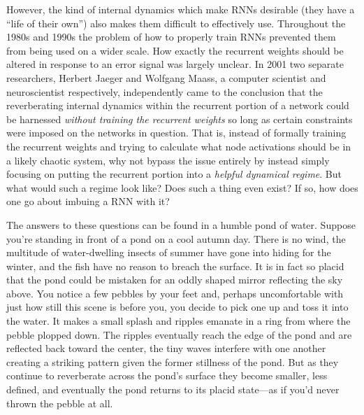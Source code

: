 However, the kind of internal dynamics which make RNNs desirable (they have a ``life of their own'') also makes them difficult to effectively use. Throughout the 1980s and 1990s the problem of how to properly train RNNs prevented them from being used on a wider scale. How exactly the recurrent weights should be altered in response to an error signal was largely unclear. In 2001 two separate researchers, Herbert Jaeger and Wolfgang Maass, a computer scientist and neuroscientist respectively, independently came to the conclusion that the reverberating internal dynamics within the recurrent portion of a network could be harnessed \emph{without training the recurrent weights} so long as certain constraints were imposed on the networks in question. That is, instead of formally training the recurrent weights and trying to calculate what node activations should be in a likely chaotic system, why not bypass the issue entirely by instead simply focusing on putting the recurrent portion into a \emph{helpful dynamical regime}. But what would such a regime look like? Does such a thing even exist? If so, how does one go about imbuing a RNN with it?

The answers to these questions can be found in a humble pond of water. Suppose you're standing in front of a pond on a cool autumn day. There is no wind, the multitude of  water-dwelling insects of summer have gone into hiding for the winter, and the fish have no reason to breach the surface. It is in fact so placid that the pond could be mistaken for an oddly shaped mirror reflecting the sky above. You notice a few pebbles by your feet and, perhaps uncomfortable with just how still this scene is before you, you decide to pick one up and toss it into the water. It makes a small splash and ripples emanate in a ring from where the pebble plopped down. The ripples eventually reach the edge of the pond and are reflected back toward the center, the tiny waves interfere with one another creating a striking pattern given the former stillness of the pond. But as they continue to reverberate across the pond's surface they become smaller, less defined, and eventually the pond returns to its placid state---as if you'd never thrown the pebble at all.

